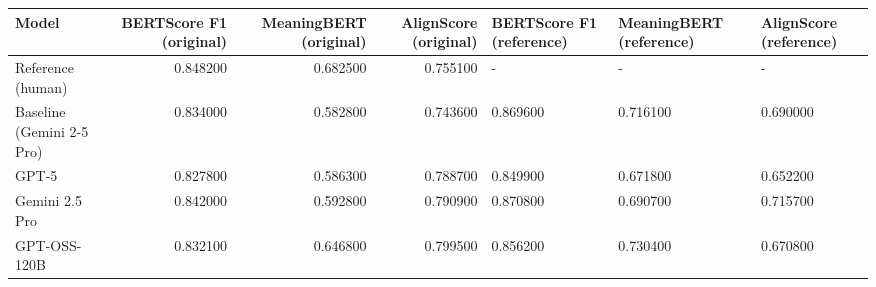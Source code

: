 \begin{tabular}{lrrrlll}
\toprule
Model & BERTScore F1 (original) & MeaningBERT (original) & AlignScore (original) & BERTScore F1 (reference) & MeaningBERT (reference) & AlignScore (reference) \\
\midrule
Reference (human) & 0.848200 & 0.682500 & 0.755100 & - & - & - \\
Baseline (Gemini 2-5 Pro) & 0.834000 & 0.582800 & 0.743600 & 0.869600 & 0.716100 & 0.690000 \\
GPT-5 & 0.827800 & 0.586300 & 0.788700 & 0.849900 & 0.671800 & 0.652200 \\
Gemini 2.5 Pro & 0.842000 & 0.592800 & 0.790900 & 0.870800 & 0.690700 & 0.715700 \\
GPT-OSS-120B & 0.832100 & 0.646800 & 0.799500 & 0.856200 & 0.730400 & 0.670800 \\
\bottomrule
\end{tabular}
